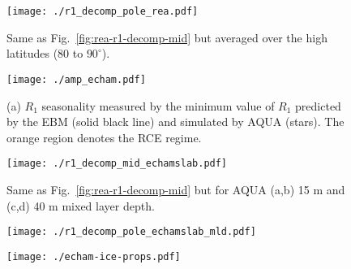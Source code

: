 \documentclass{ametsocV5}
\begin{document}
\begin{figure}[t]
  \noindent\texttt{[image: ./r1\_decomp\_pole\_rea.pdf]}\\
  \caption{Same as Fig.~\ref{fig:rea-r1-decomp-mid} but averaged over the high latitudes ($80$ to $90^{\circ}$).}
  \label{fig:rea-r1-decomp-pole}
\end{figure}

\begin{figure}
  \noindent\texttt{[image: ./amp\_echam.pdf]}\\
  \caption{(a) $R_1$ seasonality measured by the minimum value of $R_1$ predicted by the EBM (solid black line) and simulated by AQUA (stars). The orange region denotes the RCE regime.}
  \label{fig:amp-r1-echam}
\end{figure}

\begin{figure}[t]
    \noindent\texttt{[image: ./r1\_decomp\_mid\_echamslab.pdf]}\\
    \caption{Same as Fig.~\ref{fig:rea-r1-decomp-mid} but for AQUA (a,b) 15 m and (c,d) 40 m mixed layer depth.}
\label{fig:echam-rce}
\end{figure}

\begin{figure}[t]
    \noindent\texttt{[image: ./r1\_decomp\_pole\_echamslab\_mld.pdf]}\\
    \caption{}
    \label{fig:echam-rae-mld}
\end{figure}

\begin{figure}[t]
    \centering
    \noindent\texttt{[image: ./echam-ice-props.pdf]}\\
    \caption{}
    \label{fig:echam-ice-props}
\end{figure}
\end{document}
